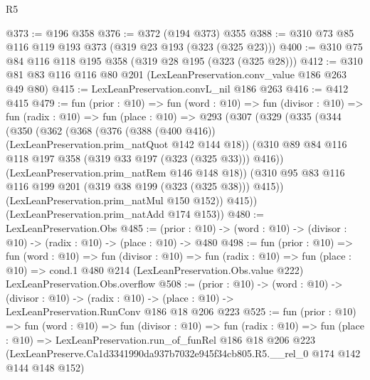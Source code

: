 \begin{lexlean}{R5}
\begin{coremodule}
@373 := @196 @358
@376 := @372 (@194 @373) @355
@388 := @310 @73 @85 @116 @119 @193 @373 (@319 @23 @193 (@323 (@325 @23)))
@400 := @310 @75 @84 @116 @118 @195 @358 (@319 @28 @195 (@323 (@325 @28)))
@412 := @310 @81 @83 @116 @116 @80 @201 (LexLeanPreservation.conv_value @186 @263 @49 @80)
@415 := LexLeanPreservation.convL_nil @186 @263
@416 := @412 @415
@479 := fun (prior : @10) =>
  fun (word : @10) =>
  fun (divisor : @10) =>
  fun (radix : @10) =>
  fun (place : @10) =>
  @293
    (@307
      (@329
        (@335
          (@344
            (@350
              (@362
                (@368
                  (@376 (@388 (@400 @416)) (LexLeanPreservation.prim_natQuot @142 @144 @18))
                  (@310 @89 @84 @116 @118 @197 @358 (@319 @33 @197 (@323 (@325 @33))) @416))
                (LexLeanPreservation.prim_natRem @146 @148 @18))
              (@310 @95 @83 @116 @116 @199 @201 (@319 @38 @199 (@323 (@325 @38))) @415))
            (LexLeanPreservation.prim_natMul @150 @152))
          @415))
      (LexLeanPreservation.prim_natAdd @174 @153))
@480 := LexLeanPreservation.Obs
@485 := (prior : @10) -> (word : @10) -> (divisor : @10) -> (radix : @10) -> (place : @10) -> @480
@498 := fun (prior : @10) =>
  fun (word : @10) =>
  fun (divisor : @10) =>
  fun (radix : @10) =>
  fun (place : @10) =>
  cond.{1} @480 @214 (LexLeanPreservation.Obs.value @222) LexLeanPreservation.Obs.overflow
@508 := (prior : @10) ->
  (word : @10) ->
  (divisor : @10) ->
  (radix : @10) -> (place : @10) -> LexLeanPreservation.RunConv @186 @18 @206 @223
@525 := fun (prior : @10) =>
  fun (word : @10) =>
  fun (divisor : @10) =>
  fun (radix : @10) =>
  fun (place : @10) =>
  LexLeanPreservation.run_of_funRel
    @186
    @18
    @206
    @223
    (LexLeanPreserve.Ca1d3341990da937b7032e945f34cb805.R5.__rel_0 @174 @142 @144 @148 @152)
\end{coremodule}
\end{lexlean}
